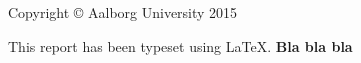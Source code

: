 \thispagestyle{empty}
{\small
\strut\vfill %
\noindent Copyright \copyright{} Aalborg University 2015\par
\vspace{0.2cm}
\noindent This report has been typeset using \LaTeX. \textbf{Bla bla bla}
}
\clearpage

